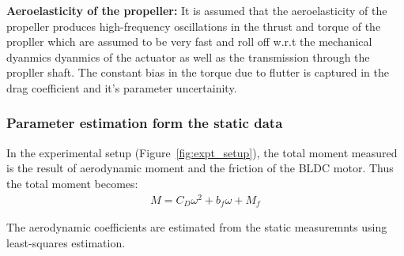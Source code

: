\bigskip

\textbf{Aeroelasticity of the propeller:} It is assumed that the aeroelasticity of the propeller produces high-frequency oscillations in the thrust and torque of the propller which are assumed to be very fast and roll off w.r.t the mechanical dyanmics dyanmics of the actuator as well as the transmission through the propller shaft. The constant  bias in the torque due to flutter is captured in the drag coefficient and it's parameter uncertainity.\\


\subsubsection{Parameter estimation form the static data}

In the experimental setup (Figure~\ref{fig:expt_setup}),  the total moment measured is the result of aerodynamic moment and the friction of the BLDC motor. Thus the total moment becomes:
\begin{align*}
    M = C_D \omega^2 + b_f \omega + M_f
\end{align*}

The aerodynamic coefficients are estimated from the static measuremnts using least-squares estimation.


